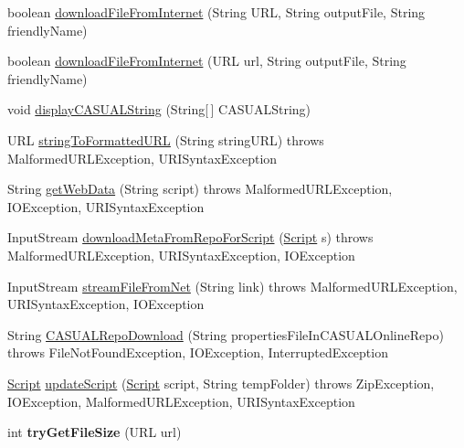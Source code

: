 \begin{DoxyCompactItemize}
\item 
boolean \hyperlink{class_c_a_s_u_a_l_1_1network_1_1_c_a_s_u_a_l_updates_a9bfc14b6130b3d0fd9e4d9fd66674938}{download\-File\-From\-Internet} (String U\-R\-L, String output\-File, String friendly\-Name)
\item 
boolean \hyperlink{class_c_a_s_u_a_l_1_1network_1_1_c_a_s_u_a_l_updates_a744e587848a05d43eef7aa75e3c30e8b}{download\-File\-From\-Internet} (U\-R\-L url, String output\-File, String friendly\-Name)
\item 
void \hyperlink{class_c_a_s_u_a_l_1_1network_1_1_c_a_s_u_a_l_updates_a0bb12c8c206be8c0814ad231ad02a104}{display\-C\-A\-S\-U\-A\-L\-String} (String\mbox{[}$\,$\mbox{]} C\-A\-S\-U\-A\-L\-String)
\item 
U\-R\-L \hyperlink{class_c_a_s_u_a_l_1_1network_1_1_c_a_s_u_a_l_updates_abb67fb934011f1386b09742f475f137c}{string\-To\-Formatted\-U\-R\-L} (String string\-U\-R\-L)  throws Malformed\-U\-R\-L\-Exception, U\-R\-I\-Syntax\-Exception 
\item 
String \hyperlink{class_c_a_s_u_a_l_1_1network_1_1_c_a_s_u_a_l_updates_a9b8929945452d42e11476348eaa0bb91}{get\-Web\-Data} (String script)  throws Malformed\-U\-R\-L\-Exception, I\-O\-Exception, U\-R\-I\-Syntax\-Exception 
\item 
Input\-Stream \hyperlink{class_c_a_s_u_a_l_1_1network_1_1_c_a_s_u_a_l_updates_a8bc8251abf97e6fb59fe2478d0a34806}{download\-Meta\-From\-Repo\-For\-Script} (\hyperlink{class_c_a_s_u_a_l_1_1caspac_1_1_script}{Script} s)  throws Malformed\-U\-R\-L\-Exception, U\-R\-I\-Syntax\-Exception, I\-O\-Exception 
\item 
Input\-Stream \hyperlink{class_c_a_s_u_a_l_1_1network_1_1_c_a_s_u_a_l_updates_ae40ac8c5ffe9d0b49214bfd9e7169304}{stream\-File\-From\-Net} (String link)  throws Malformed\-U\-R\-L\-Exception, U\-R\-I\-Syntax\-Exception, I\-O\-Exception 
\item 
String \hyperlink{class_c_a_s_u_a_l_1_1network_1_1_c_a_s_u_a_l_updates_ac425655d3ed96b358537d184c4cd1b1d}{C\-A\-S\-U\-A\-L\-Repo\-Download} (String properties\-File\-In\-C\-A\-S\-U\-A\-L\-Online\-Repo)  throws File\-Not\-Found\-Exception, I\-O\-Exception, Interrupted\-Exception 
\item 
\hyperlink{class_c_a_s_u_a_l_1_1caspac_1_1_script}{Script} \hyperlink{class_c_a_s_u_a_l_1_1network_1_1_c_a_s_u_a_l_updates_a75b4ba0d0a0852256d7af16b03c48505}{update\-Script} (\hyperlink{class_c_a_s_u_a_l_1_1caspac_1_1_script}{Script} script, String temp\-Folder)  throws Zip\-Exception, I\-O\-Exception, Malformed\-U\-R\-L\-Exception, U\-R\-I\-Syntax\-Exception 
\item 
\hypertarget{class_c_a_s_u_a_l_1_1network_1_1_c_a_s_u_a_l_updates_a8307b94648f683eae2d22ae179005bb4}{int {\bfseries try\-Get\-File\-Size} (U\-R\-L url)}\label{class_c_a_s_u_a_l_1_1network_1_1_c_a_s_u_a_l_updates_a8307b94648f683eae2d22ae179005bb4}

\end{DoxyCompactItemize}
